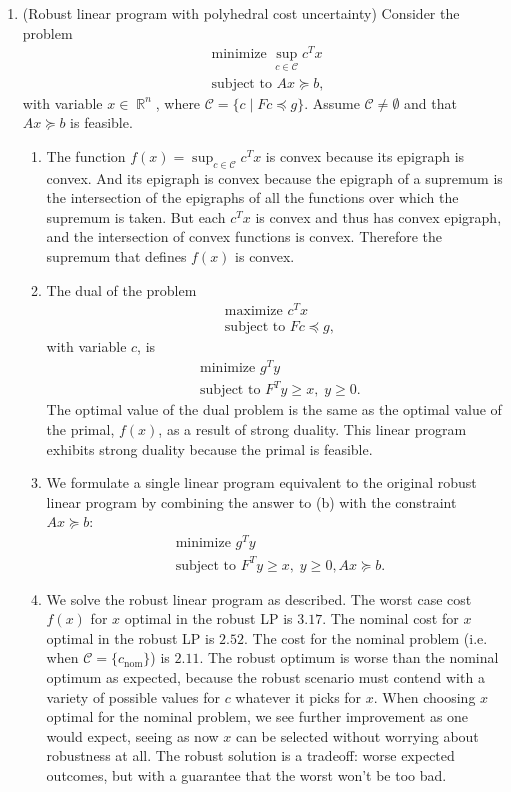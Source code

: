 \documentclass{article}
\DeclareMathOperator{\R}{\mathbb{R}}
\begin{document}
\begin{enumerate}
    \item (Robust linear program with polyhedral cost uncertainty) Consider the problem \begin{align*}
        &\text{minimize } \sup_{c \in \mathcal{C}} c^T x \\
        &\text{subject to } Ax \succeq b,
    \end{align*} with variable $x \in \R^n$, where $\mathcal{C} = \{c \mid Fc \preceq g\}$. Assume $\mathcal{C} \neq \emptyset$ and that $Ax \succeq b$ is feasible.
    \begin{enumerate}
        \item The function $f(x) = \sup_{c \in \mathcal{C}} c^T x$ is convex because its epigraph is convex. And its epigraph is convex because the epigraph of a supremum is the intersection of the epigraphs of all the functions over which the supremum is taken. But each $c^T x$ is convex and thus has convex epigraph, and the intersection of convex functions is convex. Therefore the supremum that defines $f(x)$ is convex.
        \item The dual of the problem \begin{align*}
            &\text{maximize } c^T x \\
            &\text{subject to } Fc \preceq g,
        \end{align*} with variable $c$, is \begin{align*}
            &\text{minimize } g^T y \\
            &\text{subject to } F^T y \geq x, \; y \geq 0.
        \end{align*} The optimal value of the dual problem is the same as the optimal value of the primal, $f(x)$, as a result of strong duality. This linear program exhibits strong duality because the primal is feasible.
    \item We formulate a single linear program equivalent to the original robust linear program by combining the answer to (b) with the constraint $Ax \succeq b$: \begin{align*}
            &\text{minimize } g^T y \\
            &\text{subject to } F^T y \geq x, \; y \geq 0, Ax \succeq b.
        \end{align*}
    \item We solve the robust linear program as described. The worst case cost $f(x)$ for $x$ optimal in the robust LP is $3.17$. The nominal cost for $x$ optimal in the robust LP is $2.52$. The cost for the nominal problem (i.e. when $\mathcal{C} = \{c_\text{nom}\}$) is $2.11$. The robust optimum is worse than the nominal optimum as expected, because the robust scenario must contend with a variety of possible values for $c$ whatever it picks for $x$. When choosing $x$ optimal for the nominal problem, we see further improvement as one would expect, seeing as now $x$ can be selected without worrying about robustness at all. The robust solution is a tradeoff: worse expected outcomes, but with a guarantee that the worst won't be too bad. 
    \end{enumerate}


\end{enumerate}
\end{document}
